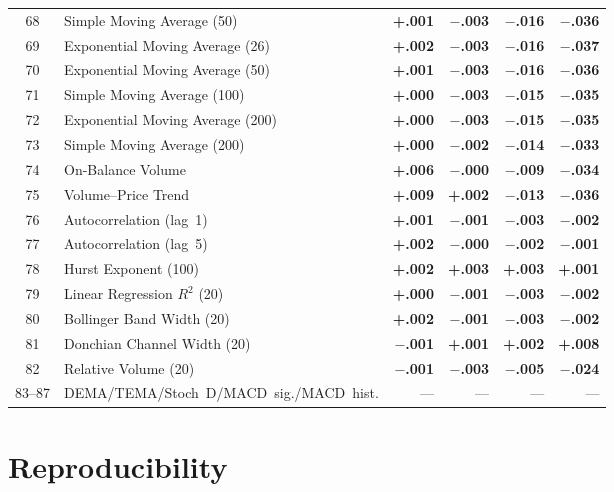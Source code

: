 \documentclass[12pt,a4paper]{article}
\theoremstyle{definition}
\theoremstyle{remark}
\newcommand{\pos}[1]{\textcolor{green1}{\textbf{+#1}}}
\newcommand{\negval}[1]{\textcolor{accent}{\textbf{$-$#1}}}
\begin{document}
\begin{longtable}{c>{\RaggedRight\arraybackslash}p{6.5cm}rrrr}
68 & Simple Moving Average (50)            & \pos{.001} & \negval{.003} & \negval{.016} & \negval{.036} \\
69 & Exponential Moving Average (26)            & \pos{.002} & \negval{.003} & \negval{.016} & \negval{.037} \\
70 & Exponential Moving Average (50)            & \pos{.001} & \negval{.003} & \negval{.016} & \negval{.036} \\
71 & Simple Moving Average (100)           & \pos{.000} & \negval{.003} & \negval{.015} & \negval{.035} \\
72 & Exponential Moving Average (200)           & \pos{.000} & \negval{.003} & \negval{.015} & \negval{.035} \\
73 & Simple Moving Average (200)           & \pos{.000} & \negval{.002} & \negval{.014} & \negval{.033} \\
74 & On-Balance Volume                & \pos{.006} & \negval{.000} & \negval{.009} & \negval{.034} \\
75 & Volume--Price Trend                & \pos{.009} & \pos{.002} & \negval{.013} & \negval{.036} \\
76 & Autocorrelation (lag~1)     & \pos{.001} & \negval{.001} & \negval{.003} & \negval{.002} \\
77 & Autocorrelation (lag~5)     & \pos{.002} & \negval{.000} & \negval{.002} & \negval{.001} \\
78 & Hurst Exponent (100)         & \pos{.002} & \pos{.003} & \pos{.003} & \pos{.001} \\
79 & Linear Regression $R^{2}$ (20)         & \pos{.000} & \negval{.001} & \negval{.003} & \negval{.002} \\
80 & Bollinger Band Width (20)      & \pos{.002} & \negval{.001} & \negval{.003} & \negval{.002} \\
81 & Donchian Channel Width (20)& \negval{.001} & \pos{.001} & \pos{.002} & \pos{.008} \\
82 & Relative Volume (20)           & \negval{.001} & \negval{.003} & \negval{.005} & \negval{.024} \\
83--87 & DEMA\slash TEMA\slash Stoch~D\slash MACD~sig.\slash MACD~hist.
  & --- & --- & --- & --- \\
\end{longtable}

\section{Reproducibility}
\label{app:repro}
\end{document}
